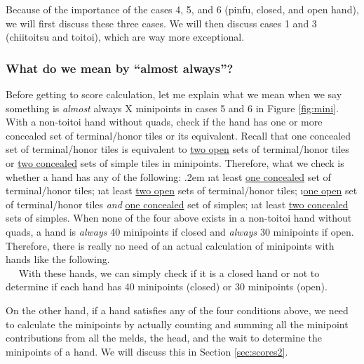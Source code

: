 \bigskip
Because of the importance of the cases 4, 5, and 6 ({\jap pinfu}, closed, and open hand), we will first discuss these three cases. We will then discuss cases 1 and 3 ({\jap chiitoitsu} and {\jap toitoi}), which are way more exceptional.

\subsubsection{What do we mean by ``almost always''?}
Before getting to score calculation, let me explain what we mean when we say something is \emph{almost} always X minipoints in cases 5 and 6 in Figure \ref{fig:mini}.
With a non-{\jap toitoi} hand without quads, check if the hand has one or more concealed set of terminal/honor tiles or its equivalent. Recall that one concealed set of terminal/honor tiles is equivalent to \underline{two open} sets of terminal/honor tiles or \underline{two concealed} sets of simple tiles in minipoints.
Therefore, what we check is whether a hand has any of the following:
\bi \itemsep.2em
\i at least \underline{one concealed} set of terminal/honor tiles;
\i at least \underline{two open} sets of terminal/honor tiles;
\i \underline{one open} set of terminal/honor tiles \emph{and}
\underline{one concealed} set of simples;
\i at least \underline{two concealed} sets of simples.
\ei
When none of the four above exists in a non-{\jap toitoi} hand without quads, a hand is \emph{always} 40 minipoints if closed and \emph{always} 30 minipoints if open. Therefore, there is really no need of an actual calculation of minipoints with hands like the following.
\bp
{}~\zhong\rzhong\zhong\\
~\rdong\dong\dong~
\ep
With these hands, we can simply check if it is a closed hand or not to determine if each hand has 40 minipoints (closed) or 30 minipoints (open).

\bigskip
On the other hand, if a hand satisfies any of the four conditions above, we need to calculate the minipoints by actually counting and summing all the minipoint contributions from all the melds, the head, and the wait to determine the minipoints of a hand. We will discuss this in Section \ref{sec:scores2}.


